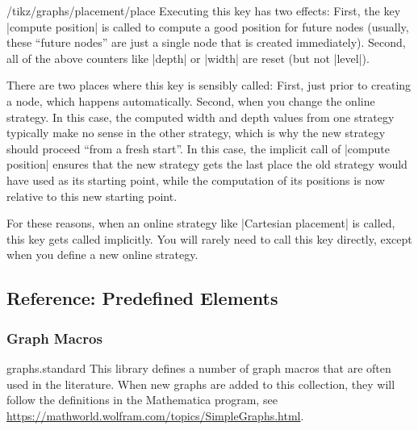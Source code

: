 \begin{key}{/tikz/graphs/placement/place}
    Executing this key has two effects: First, the key |compute position| is
    called to compute a good position for future nodes (usually, these ``future
    nodes'' are just a single node that is created immediately). Second, all of
    the above counters like |depth| or |width| are reset (but not |level|).

    There are two places where this key is sensibly called: First, just prior
    to creating a node, which happens automatically. Second, when you change
    the online strategy. In this case, the computed width and depth values from
    one strategy typically make no sense in the other strategy, which is why
    the new strategy should proceed ``from a fresh start''. In this case, the
    implicit call of |compute position| ensures that the new strategy gets the
    last place the old strategy would have used as its starting point, while
    the computation of its positions is now relative to this new starting
    point.

    For these reasons, when an online strategy like |Cartesian placement| is
    called, this key gets called implicitly. You will rarely need to call this
    key directly, except when you define a new online strategy.
\end{key}


\subsection{Reference: Predefined Elements}
\label{section-library-graphs-reference}

\subsubsection{Graph Macros}
\label{section-library-graphs-reference-macros}

\begin{tikzlibrary}{graphs.standard}
    This library defines a number of graph macros that are often used in the
    literature. When new graphs are added to this collection, they will follow
    the definitions in the Mathematica program, see
    \url{https://mathworld.wolfram.com/topics/SimpleGraphs.html}.
\end{tikzlibrary}

